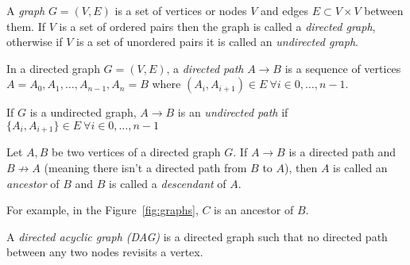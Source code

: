 
\begin{definition}
A \emph{graph} \(G = (V,E)\) is a set of vertices or nodes \(V\) and edges \(E\subset
V\times V\) between them.
If \(V\) is a set of ordered pairs then the graph is called a \emph{directed
  graph}, otherwise if \(V\) is a set of unordered pairs it is called an \emph{undirected graph}.
\end{definition}

\begin{figure*}[h]
\centering
{}
\caption{Example of directed and undirected graph, respectively.}
\label{fig:graphs}
\end{figure*}

\begin{definition}
In a directed graph \(G = (V, E)\), a \emph{directed path} \(A \to B\) is a sequence of vertices \({A = A_0,
  A_1,\dots,A_{n-1}, A_n = B}\) where \((A_i, A_{i+1}) \in E \ \forall i \in
0,\dots ,n-1\).

If \(G\) is a undirected graph, \(A \to B\) is an \emph{undirected path} if \(\{A_i, A_{i+1}\} \in E \ \forall i \in
0,\dots, n-1\)
\end{definition}

\begin{definition}
Let \(A,B\) be two vertices of a directed graph \(G\). If \(A \to B\) is a
directed path and \(B \not \to A\) (meaning there isn't a directed path from
\(B\) to \(A\)), then \(A\) is called an \emph{ancestor} of \(B\) and \(B\) is called a \emph{descendant} of \(A\).
\end{definition}

For example, in the Figure~\ref{fig:graphs}, \(C\) is an ancestor of \(B\).

\begin{definition}
A \emph{directed acyclic graph (DAG)} is a directed graph such that no directed path between any two nodes revisits a vertex.
\end{definition}


